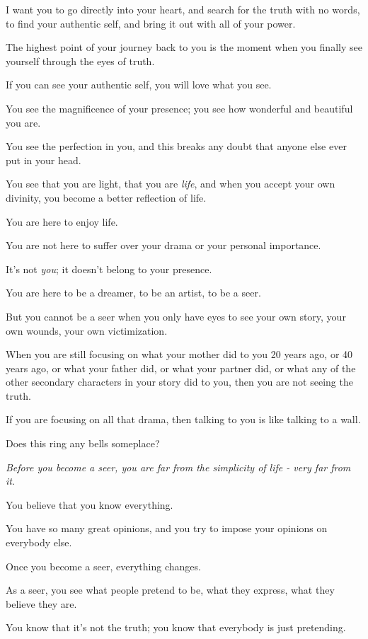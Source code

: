 \documentclass{article}
\numberwithin{equation}{section}
\begin{document}
I want you to go directly into your heart, and search for the truth with no words, to find your authentic self, and bring it out with all of your power.

%
The highest point of your journey back to you is the moment when you finally see yourself through the eyes of truth.

If you can see your authentic self, you will love what you see.

You see the magnificence of your presence; you see how wonderful and beautiful you are.

You see the perfection in you, and this breaks any doubt that anyone else ever put in your head.

You see that you are light, that you are \textit{life}, and when you accept your own divinity, you become a better reflection of life.

%
You are here to enjoy life.

You are not here to suffer over your drama or your personal importance.

It's not \textit{you}; it doesn't belong to your presence.

You are here to be a dreamer, to be an artist, to be a seer.

But you cannot be a seer when you only have eyes to see your own story, your own wounds, your own victimization.

When you are still focusing on what your mother did to you 20 years ago, or 40 years ago, or what your father did, or what your partner did, or what any of the other secondary characters in your story did to you, then you are not seeing the truth.

If you are focusing on all that drama, then talking to you is like talking to a wall.

Does this ring any bells someplace?

%
\textit{Before you become a seer, you are far from the simplicity of life - very far from it}.

You believe that you know everything.

You have so many great opinions, and you try to impose your opinions on everybody else.

Once you become a seer, everything changes.

As a seer, you see what people pretend to be, what they express, what they believe they are.

You know that it's not the truth; you know that everybody is just pretending.
\end{document}
